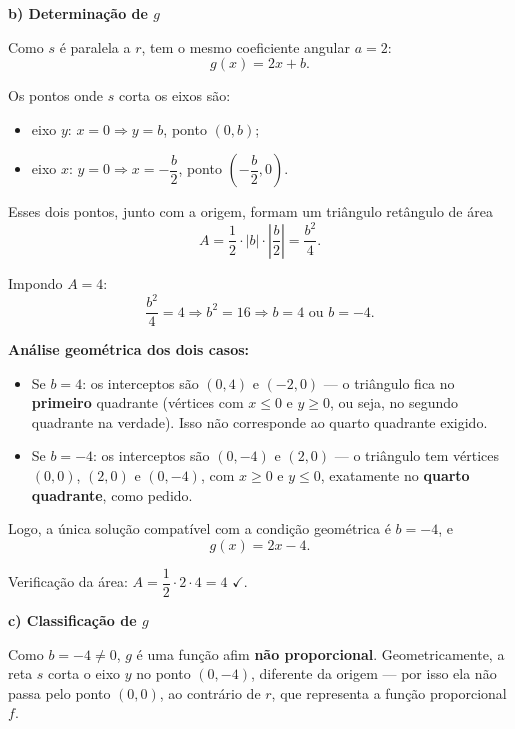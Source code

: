 \documentclass[11pt,a4paper]{article}
\begin{document}
\textbf{b) Determinação de $g$}

Como $s$ é paralela a $r$, tem o mesmo coeficiente angular $a=2$:
$$g(x) = 2x + b.$$

Os pontos onde $s$ corta os eixos são:
\begin{itemize}[nosep,leftmargin=*]
\item eixo $y$: $x=0 \Rightarrow y=b$, ponto $(0,b)$;
\item eixo $x$: $y=0 \Rightarrow x=-\dfrac{b}{2}$, ponto $\left(-\dfrac{b}{2},0\right)$.
\end{itemize}

Esses dois pontos, junto com a origem, formam um triângulo retângulo de área
$$A = \frac{1}{2}\cdot|b|\cdot\left|\frac{b}{2}\right| = \frac{b^2}{4}.$$

Impondo $A=4$:
$$\frac{b^2}{4}=4 \Rightarrow b^2=16 \Rightarrow b=4 \text{ ou } b=-4.$$

\textbf{Análise geométrica dos dois casos:}

\begin{itemize}[nosep,leftmargin=*]
\item Se $b=4$: os interceptos são $(0,4)$ e $(-2,0)$ — o triângulo fica no \textbf{primeiro} quadrante (vértices com $x\le 0$ e $y\ge 0$, ou seja, no segundo quadrante na verdade). Isso não corresponde ao quarto quadrante exigido.
\item Se $b=-4$: os interceptos são $(0,-4)$ e $(2,0)$ — o triângulo tem vértices $(0,0)$, $(2,0)$ e $(0,-4)$, com $x\ge 0$ e $y\le 0$, exatamente no \textbf{quarto quadrante}, como pedido.
\end{itemize}

Logo, a única solução compatível com a condição geométrica é $b=-4$, e
$$g(x) = 2x - 4.$$

Verificação da área: $A=\dfrac{1}{2}\cdot 2\cdot 4 = 4$ $\checkmark$.

\textbf{c) Classificação de $g$}

Como $b=-4\neq 0$, $g$ é uma função afim \textbf{não proporcional}. Geometricamente, a reta $s$ corta o eixo $y$ no ponto $(0,-4)$, diferente da origem — por isso ela não passa pelo ponto $(0,0)$, ao contrário de $r$, que representa a função proporcional $f$.
\end{document}
